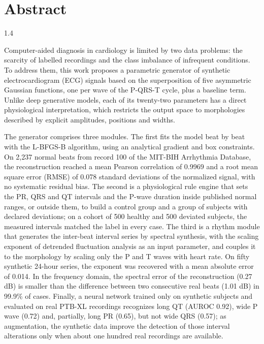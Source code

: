 \section*{Abstract}
\begin{spacing}{1.4}

Computer-aided diagnosis in cardiology is limited by two data problems: the scarcity of labelled recordings and the class imbalance of infrequent conditions. To address them, this work proposes a parametric generator of synthetic electrocardiogram (ECG) signals based on the superposition of five asymmetric Gaussian functions, one per wave of the P-QRS-T cycle, plus a baseline term. Unlike deep generative models, each of its twenty-two parameters has a direct physiological interpretation, which restricts the output space to morphologies described by explicit amplitudes, positions and widths.

The generator comprises three modules. The first fits the model beat by beat with the L-BFGS-B algorithm, using an analytical gradient and box constraints. On 2,237 normal beats from record 100 of the MIT-BIH Arrhythmia Database, the reconstruction reached a mean Pearson correlation of 0.9969 and a root mean square error (RMSE) of 0.078 standard deviations of the normalized signal, with no systematic residual bias. The second is a physiological rule engine that sets the PR, QRS and QT intervals and the P-wave duration inside published normal ranges, or outside them, to build a control group and a group of subjects with declared deviations; on a cohort of 500 healthy and 500 deviated subjects, the measured intervals matched the label in every case. The third is a rhythm module that generates the inter-beat interval series by spectral synthesis, with the scaling exponent of detrended fluctuation analysis as an input parameter, and couples it to the morphology by scaling only the P and T waves with heart rate. On fifty synthetic 24-hour series, the exponent was recovered with a mean absolute error of 0.014. In the frequency domain, the spectral error of the reconstruction (0.27 dB) is smaller than the difference between two consecutive real beats (1.01 dB) in 99.9\% of cases. Finally, a neural network trained only on synthetic subjects and evaluated on real PTB-XL recordings recognizes long QT (AUROC 0.92), wide P wave (0.72) and, partially, long PR (0.65), but not wide QRS (0.57); as augmentation, the synthetic data improve the detection of those interval alterations only when about one hundred real recordings are available.


\end{spacing}
